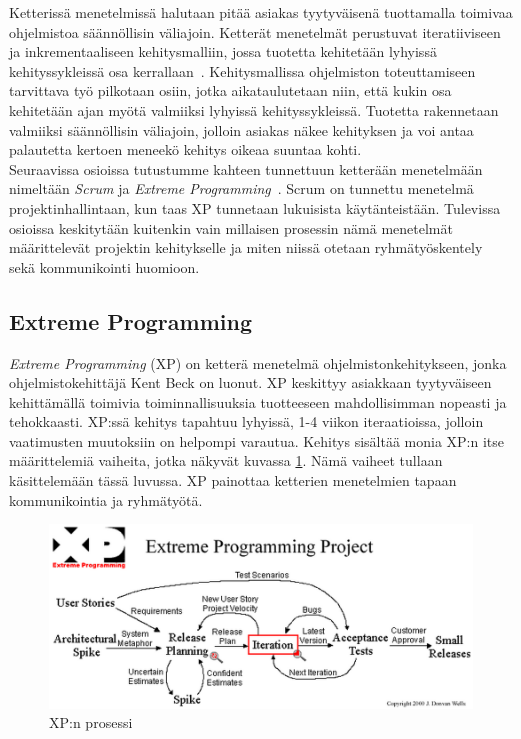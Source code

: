 \documentclass[finnish]{../tktltiki2}
\theoremstyle{definition}
\theoremstyle{remark}
\begin{document}
Ketterissä menetelmissä halutaan pitää asiakas tyytyväisenä tuottamalla toimivaa
ohjelmistoa säännöllisin väliajoin. Ketterät menetelmät perustuvat iteratiiviseen ja inkrementaaliseen kehitysmalliin, jossa tuotetta kehitetään lyhyissä kehityssykleissä osa kerrallaan~\cite{Cockburn:2008}. Kehitysmallissa ohjelmiston toteuttamiseen tarvittava työ pilkotaan osiin, jotka aikataulutetaan niin, että kukin osa kehitetään ajan myötä valmiiksi lyhyissä kehityssykleissä. Tuotetta rakennetaan valmiiksi säännöllisin väliajoin, jolloin asiakas näkee kehityksen ja voi antaa palautetta kertoen meneekö kehitys oikeaa suuntaa kohti.\\

Seuraavissa osioissa tutustumme kahteen tunnettuun
ketterään menetelmään nimeltään \emph{Scrum} ja \emph{Extreme Programming}~\cite{ScrumFinnishGuide,Beck:2004:EPE:1076267,Scrumprimer,ScrumHandBook}. Scrum on tunnettu menetelmä projektinhallintaan, kun taas XP tunnetaan lukuisista käytänteistään. Tulevissa osioissa keskitytään kuitenkin vain millaisen prosessin nämä menetelmät
määrittelevät projektin kehitykselle ja miten niissä otetaan ryhmätyöskentely sekä kommunikointi huomioon.

\subsection{Extreme Programming}

\emph{Extreme Programming} (XP) on ketterä menetelmä ohjelmistonkehitykseen, jonka
ohjelmistokehittäjä Kent Beck on luonut. XP keskittyy asiakkaan tyytyväiseen kehittämällä toimivia toiminnallisuuksia tuotteeseen mahdollisimman nopeasti ja tehokkaasti.
XP:ssä kehitys tapahtuu lyhyissä, 1-4 viikon iteraatioissa, jolloin vaatimusten 
muutoksiin on helpompi varautua. Kehitys sisältää monia XP:n itse määrittelemiä vaiheita, jotka
näkyvät kuvassa \ref{xprocess}. Nämä vaiheet tullaan käsittelemään tässä luvussa.
XP painottaa ketterien menetelmien tapaan kommunikointia ja ryhmätyötä.

\begin{figure}[ht]
     \includegraphics[width=12cm]{xp.png}
     \caption{XP:n prosessi~\cite{XP.ORGMAP}}\label{xprocess}
\end{figure}
\end{document}
